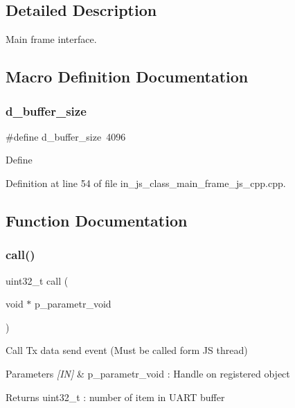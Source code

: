 \subsection{Detailed Description}
Main frame interface. 



\subsection{Macro Definition Documentation}
\mbox{\label{group__main__frame_ga8c96cc9b53c76c39830354bb412ff059}} 
\subsubsection{d\_buffer\_size}
{\footnotesize\ttfamily \#define d\+\_\+buffer\+\_\+size~4096}

Define 

Definition at line 54 of file in\+\_\+js\+\_\+class\+\_\+main\+\_\+frame\+\_\+js\+\_\+cpp.\+cpp.



\subsection{Function Documentation}
\mbox{\label{group__main__frame_ga0f26df9896cdb77a44c97bf86311027e}} 
\subsubsection{call()}
{\footnotesize\ttfamily uint32\+\_\+t call (\begin{DoxyParamCaption}\item[{void $\ast$}]{p\+\_\+parametr\+\_\+void }\end{DoxyParamCaption})\hspace{0.3cm}{\ttfamily [static]}}



Call Tx data send event (Must be called form JS thread) 


\begin{DoxyParams}{Parameters}
{\em \mbox{[}\+I\+N\mbox{]}} & p\+\_\+parametr\+\_\+void \+: Handle on registered object \\
\hline
\end{DoxyParams}
\begin{DoxyReturn}{Returns}
uint32\+\_\+t \+: number of item in U\+A\+RT buffer 
\end{DoxyReturn}


